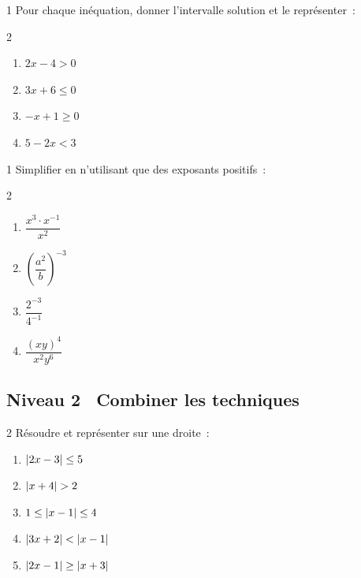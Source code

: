 \begin{exo}{1}
Pour chaque in\'equation, donner l'intervalle solution et le repr\'esenter~:
\begin{multicols}{2}
\begin{enumerate}
  \item $2x - 4 > 0$
  \item $3x + 6 \leq 0$
  \item $-x + 1 \geq 0$
  \item $5 - 2x < 3$
\end{enumerate}
\end{multicols}
\end{exo}

\begin{exo}{1}
Simplifier en n'utilisant que des exposants positifs~:
\begin{multicols}{2}
\begin{enumerate}
  \item $\dfrac{x^3 \cdot x^{-1}}{x^2}$
  \item $\left(\dfrac{a^2}{b}\right)^{-3}$
  \item $\dfrac{2^{-3}}{4^{-1}}$
  \item $\dfrac{(xy)^4}{x^2 y^6}$
\end{enumerate}
\end{multicols}
\end{exo}

\subsection*{\quad Niveau 2 \textemdash\ Combiner les techniques}

\begin{exo}{2}
R\'esoudre et repr\'esenter sur une droite~:
\begin{enumerate}
  \item $\left|2x-3\right| \leq 5$
  \item $\left|x+4\right| > 2$
  \item $1 \leq \left|x-1\right| \leq 4$
  \item $\left|3x+2\right| < \left|x-1\right|$
  \item $\left|2x-1\right| \geq \left|x+3\right|$
\end{enumerate}
\end{exo}

